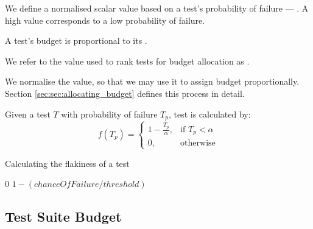 We define a normalised scalar value based on a test's probability of failure --- \emph{\flakiness{}}. A high \flakiness{} value corresponds to a low probability of failure.

A test's \flaky{} budget is proportional to its \flakiness{}.



We refer to the value used to rank \flaky{} tests for budget allocation as \emph{\flakiness{}}.

We normalise the value, so that we may use it to assign budget proportionally. Section \ref{sec:sec:allocating_budget} defines this process in detail.

\begin{defn}[\Flakiness{}]\label{def:flakiness}

Given a test $T$ with probability of failure $T_{p}$, test \flakiness{} is calculated by:
\[
    f(T_{p})=
	\begin{cases}
	    1 - \frac{T_{p}}{\alpha},& \text{if } T_{p}< \alpha\\
	    0,              & \text{otherwise}
	\end{cases}
\]

\end{defn}

\algrenewcommand{}
\algrenewcommand{}

\begin{algorithm}[here]\label{alg:app:calculateFlakiness}
\caption{Calculating the flakiness of a test}
\begin{algorithmic}
	\Require{$chanceOfFailure$ and $threshold$ are decimal values within ranges $[0, 1]$ and $(0,1]$ respectively.}
    \Statex


		\State \Return $0$
	\Else
		\State \Return $1 - (chanceOfFailure / threshold)$
	\EndIf

	\EndFunction
\end{algorithmic}
\end{algorithm}


\subsection{Test Suite Budget}
\label{sec:sec:budget}


